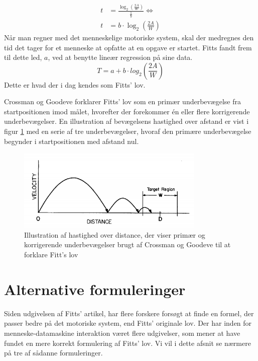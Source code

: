 \begin{align*}
t &= \frac{\log_2\left(\frac{2A}{W}\right)}{\frac{1}{b}} \Leftrightarrow\\ 
t &= b \cdot \log_2\left(\frac{2A}{W}\right)
\end{align*}
Når man regner med det menneskelige motoriske system, skal der medregnes den tid det tager for et menneske at opfatte at en opgave er startet. Fitts fandt frem til dette led, $a$, ved at benytte lineær regression på sine data.
\begin{equation}
\label{eq:FittsLov}
T = a + b \cdot log_2\left(\frac{2A}{W}\right)
\end{equation}
Dette er hvad der i dag kendes som Fitts' lov.

Crossman og Goodeve \cite{crossman1983} forklarer Fitts' lov som en primær underbevægelse fra startpositionen imod målet, hvorefter der forekommer én eller flere korrigerende underbevægelser. En illustration af bevægelsens hastighed over afstand er vist i figur \ref{fig:CrossmanFitt} med en serie af tre underbevægelser, hvoraf den primære underbevægelse begynder i startpositionen med afstand nul.
\begin{figure}[h]
\centering
\includegraphics[width=.5\linewidth]{images/illustrations/base_model_fitt}
\caption{Illustration af hastighed over distance, der viser primær og korrigerende underbevægelser brugt af Crossman og Goodeve til at forklare Fitt's lov \cite{meyer1988}}
\label{fig:CrossmanFitt}
\end{figure}

\newpage
{}
\section*{Alternative formuleringer}
Siden udgivelsen af Fitts’ artikel, har flere forskere forsøgt at finde en formel, der passer bedre på det motoriske system, end Fitts’ originale lov. Der har inden for menneske-datamaskine interaktion været flere udgivelser, som mener at have fundet en mere korrekt formulering af Fitts’ lov. Vi vil i dette afsnit se nærmere på tre af sådanne formuleringer.

